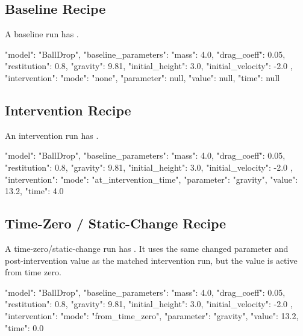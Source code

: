 \documentclass[11pt]{article}
\begin{document}
\subsection*{Baseline Recipe}

A baseline run has .

\begin{DocCode}
{
  "model": "BallDrop",
  "baseline_parameters": {
    "mass": 4.0,
    "drag_coeff": 0.05,
    "restitution": 0.8,
    "gravity": 9.81,
    "initial_height": 3.0,
    "initial_velocity": -2.0
  },
  "intervention": {
    "mode": "none",
    "parameter": null,
    "value": null,
    "time": null
  }
}
\end{DocCode}

\subsection*{Intervention Recipe}

An intervention run has .

\begin{DocCode}
{
  "model": "BallDrop",
  "baseline_parameters": {
    "mass": 4.0,
    "drag_coeff": 0.05,
    "restitution": 0.8,
    "gravity": 9.81,
    "initial_height": 3.0,
    "initial_velocity": -2.0
  },
  "intervention": {
    "mode": "at_intervention_time",
    "parameter": "gravity",
    "value": 13.2,
    "time": 4.0
  }
}
\end{DocCode}

\subsection*{Time-Zero / Static-Change Recipe}

A time-zero/static-change run has .
It uses the same changed parameter and post-intervention value as the matched intervention run, but the value is active from time zero.

\begin{DocCode}
{
  "model": "BallDrop",
  "baseline_parameters": {
    "mass": 4.0,
    "drag_coeff": 0.05,
    "restitution": 0.8,
    "gravity": 9.81,
    "initial_height": 3.0,
    "initial_velocity": -2.0
  },
  "intervention": {
    "mode": "from_time_zero",
    "parameter": "gravity",
    "value": 13.2,
    "time": 0.0
  }
}
\end{DocCode}

\section*{\texorpdfstring{}{baseline\_parameters}}
\end{document}

